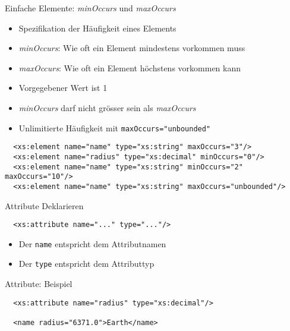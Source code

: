 \documentclass{beamer}
\begin{document}
\begin{frame}[fragile]{Einfache Elemente: \emph{minOccurs} und \emph{maxOccurs}}
	
	\begin{itemize}
		\item Spezifikation der Häufigkeit eines Elements
		\item \emph{minOccurs}: Wie oft ein Element mindestens vorkommen muss
		\item \emph{maxOccurs}: Wie oft ein Element höchstens vorkommen kann
		\item Vorgegebener Wert ist 1
		\item \emph{minOccurs} darf nicht grösser sein als \emph{maxOccurs}
		\item Unlimitierte Häufigkeit mit \texttt{maxOccurs="unbounded"}
	\end{itemize}
	
	\lstset{language=XML}
	\footnotesize
	\begin{lstlisting}	
  <xs:element name="name" type="xs:string" maxOccurs="3"/>
  <xs:element name="radius" type="xs:decimal" minOccurs="0"/>
  <xs:element name="name" type="xs:string" minOccurs="2" maxOccurs="10"/>
  <xs:element name="name" type="xs:string" maxOccurs="unbounded"/>
	\end{lstlisting}
	
\end{frame}

\begin{frame}[fragile]{Attribute Deklarieren}
	
	\lstset{language=XML}
	\begin{lstlisting}	
  <xs:attribute name="..." type="..."/>
	\end{lstlisting}
	
	\begin{itemize}
		\item Der \texttt{name} entspricht dem Attributnamen
		\item Der \texttt{type} entspricht dem Attributtyp
	\end{itemize}
	
\end{frame}

\begin{frame}[fragile]{Attribute: Beispiel}
	
	\lstset{language=XML}
	\begin{lstlisting}	
  <xs:attribute name="radius" type="xs:decimal"/>
	
  <name radius="6371.0">Earth</name>
	\end{lstlisting}
	
\end{frame}
\end{document}
